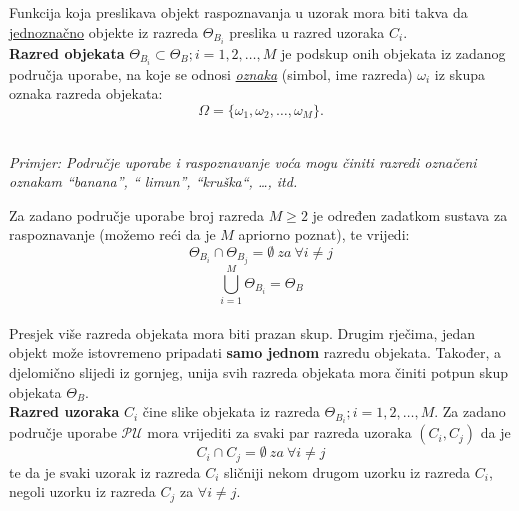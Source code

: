 \documentclass{book}
\begin{document}

Funkcija koja preslikava objekt raspoznavanja u uzorak  mora biti takva da
\underline{jednoznačno} objekte iz razreda $\Theta_{B_i}$ preslika u razred
uzoraka $C_i$. \\ 


\textbf{Razred objekata } $ \Theta_{B_i} \subset
\Theta_B; i=1,2,\ldots, M $  je podskup onih  objekata iz zadanog područja
uporabe, na koje se odnosi \underline{\textit{oznaka}} (simbol, ime razreda)
$\omega_i$ iz skupa oznaka razreda objekata: $$ \Omega = \{ \omega_1, \omega_2,
\ldots, \omega_M \} .$$ \\

\begin{shaded}
\textit{ Primjer:   Područje uporabe i raspoznavanje voća mogu činiti razredi
označeni oznakam ``banana'', `` limun'', ``kruška``, \ldots, itd. } \\
\end{shaded}


Za zadano područje uporabe broj razreda $M \geq 2 $ je određen zadatkom sustava
za raspoznavanje (možemo reći da je $M$ apriorno poznat), te 
vrijedi: $$ \Theta_{B_i} \cap \Theta_{B_j} = \emptyset \ za \ \forall i \neq j
$$ $$ \bigcup\limits^{M}_{i=1} \Theta_{B_i} = \Theta_B $$ \\

Presjek više razreda objekata mora biti prazan skup. Drugim rječima, jedan
objekt može istovremeno pripadati \textbf{samo jednom} razredu objekata.
Također, a djelomično slijedi iz gornjeg, unija svih razreda objekata mora
činiti potpun skup objekata $\Theta_B$. \\

 \textbf{Razred
uzoraka} $C_i$ čine slike objekata iz razreda  $\Theta_{B_i}; i =1,2,\ldots,M$.
Za zadano područje uporabe $\mathcal{PU}$ mora vrijediti za  svaki par razreda
uzoraka $(C_i, C_j)$ da je $$ C_i \cap C_j = \emptyset \ za \ \forall i \neq j $$
te da je svaki uzorak iz razreda $C_i$  sličniji nekom  drugom uzorku iz razreda
$C_i$, negoli uzorku iz razreda $C_j$ za $\forall i \neq j $. \\
\end{document}
